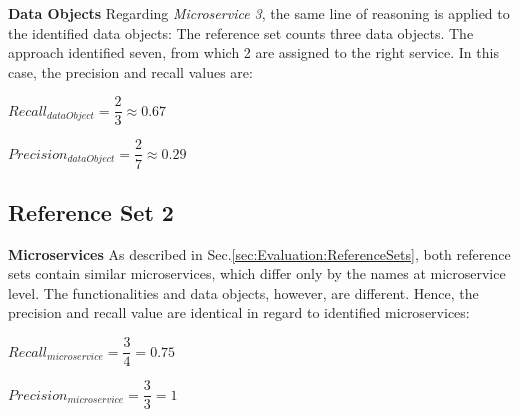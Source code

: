 \noindent
\textbf{Data Objects} Regarding \textit{Microservice 3}, the same line of reasoning is applied to the identified data objects: The reference set counts three data objects. The approach identified seven, from which 2 are assigned to the right service. In this case, the precision and recall values are:


\hspace{1cm}
\noindent
\begin{minipage}{.4\linewidth}
	\vspace{0.5cm}
	\flushleft
	
	
	$Recall_{dataObject}=\dfrac{2}{3} \approx 0.67  $
	\vspace{0.5cm}
	
\end{minipage}%
\begin{minipage}{.5\linewidth}
	\vspace{0.5cm}
	\flushleft
	
	
	$Precision_{dataObject}=\dfrac{2}{7} \approx 0.29  $
	\vspace{0.5cm}
	
\end{minipage}





\subsection{Reference Set 2}



\textbf{Microservices} As described in Sec.\ref{sec:Evaluation:ReferenceSets}, both reference sets contain similar microservices, which differ only by the names at microservice level. The functionalities and data objects, however, are different. Hence, the precision and recall value are identical in regard to identified microservices:

\hspace{1cm}
\noindent
\begin{minipage}{.4\linewidth}
	\vspace{0.5cm}
	\flushleft
	
	
	$Recall_{microservice}=\dfrac{3}{4} = 0.75  $
	\vspace{0.5cm}
	
\end{minipage}%
\begin{minipage}{.5\linewidth}
	\vspace{0.5cm}
	\flushleft
	
	
	$Precision_{microservice}=\dfrac{3}{3} = 1  $
	\vspace{0.5cm}
	
\end{minipage}

